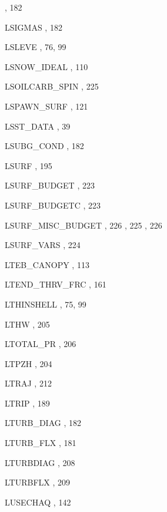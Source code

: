 \begin{theindex}
    \subitem {},  182
  \item LSIGMAS
    \subitem {},  182
  \item LSLEVE
    \subitem {},  76, 99
  \item LSNOW\_IDEAL
    \subitem {},  110
  \item LSOILCARB\_SPIN
    \subitem {},  225
  \item LSPAWN\_SURF
    \subitem {},  121
  \item LSST\_DATA
    \subitem {},  39
  \item LSUBG\_COND
    \subitem {},  182
  \item LSURF
    \subitem {},  195
  \item LSURF\_BUDGET
    \subitem {},  223
  \item LSURF\_BUDGETC
    \subitem {},  223
  \item LSURF\_MISC\_BUDGET
    \subitem {},  226
    \subitem {},  225
    \subitem {},  226
  \item LSURF\_VARS
    \subitem {},  224
  \item LTEB\_CANOPY
    \subitem {},  113
  \item LTEND\_THRV\_FRC
    \subitem {},  161
  \item LTHINSHELL
    \subitem {},  75, 99
  \item LTHW
    \subitem {},  205
  \item LTOTAL\_PR
    \subitem {},  206
  \item LTPZH
    \subitem {},  204
  \item LTRAJ
    \subitem {},  212
  \item LTRIP
    \subitem {},  189
  \item LTURB\_DIAG
    \subitem {},  182
  \item LTURB\_FLX
    \subitem {},  181
  \item LTURBDIAG
    \subitem {},  208
  \item LTURBFLX
    \subitem {},  209
  \item LUSECHAQ
    \subitem {},  142

\end{theindex}
